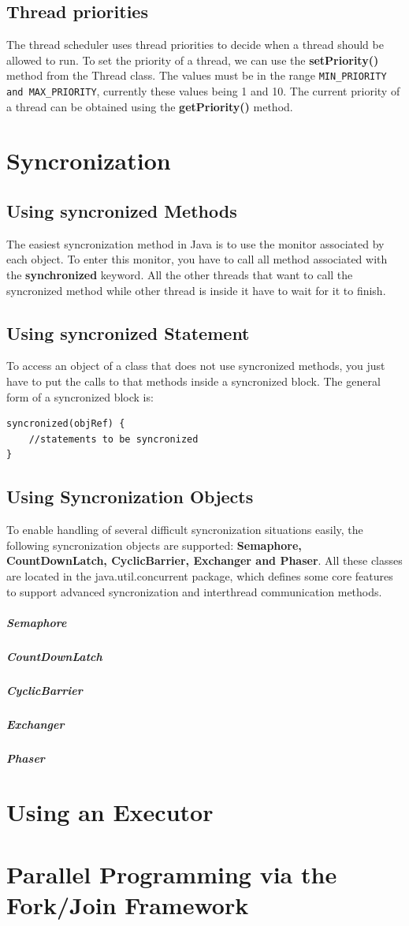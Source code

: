 \subsection{Thread priorities}

The thread scheduler uses thread priorities to decide when a thread should be allowed to run. To set the priority of a thread, we can use the \textbf{setPriority()} method from the Thread class. The values must be in the range \verb|MIN_PRIORITY and MAX_PRIORITY|, currently these values being 1 and 10. The current priority of a thread can be obtained using the \textbf{getPriority()} method.

\section{Syncronization}

\subsection{Using syncronized Methods}

The easiest syncronization method in Java is to use the monitor associated by each object. To enter this monitor, you have to call all method associated with the \textbf{synchronized} keyword. All the other threads that want to call the syncronized method while other thread is inside it have to wait for it to finish.

\subsection{Using syncronized Statement}

To access an object of a class that does not use syncronized methods, you just have to put the calls to that methods inside a syncronized block. The general form of a syncronized block is:
\begin{lstlisting}
syncronized(objRef) {
	//statements to be syncronized
}
\end{lstlisting}

\subsection{Using Syncronization Objects}

To enable handling of several difficult syncronization situations easily, the following syncronization objects are supported: \textbf{Semaphore, CountDownLatch, CyclicBarrier, Exchanger and Phaser}. All these classes are located in the java.util.concurrent package, which defines some core features to support advanced syncronization and interthread communication methods.

\subparagraph{Semaphore}
\subparagraph{CountDownLatch}
\subparagraph{CyclicBarrier}
\subparagraph{Exchanger}
\subparagraph{Phaser}

\section{Using an Executor}

\section{Parallel Programming via the Fork/Join Framework}